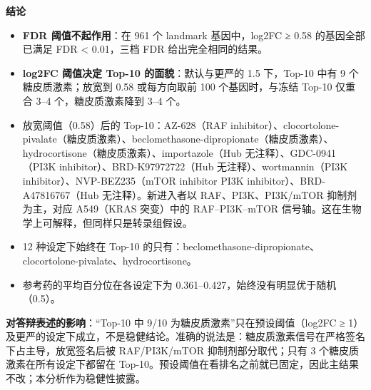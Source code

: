 \documentclass[
  10pt,
]{ctexart}
\providecommand{\tightlist}{%
  \setlength{\itemsep}{0pt}\setlength{\parskip}{0pt}}
\begin{document}
\textbf{结论}

\begin{itemize}
\tightlist
\item
  \textbf{FDR 阈值不起作用}：在 961 个 landmark
  基因中，\textbar log2FC\textbar{} ≥ 0.58 的基因全部已满足 FDR
  \textless{} 0.01，三档 FDR 给出完全相同的结果。
\item
  \textbf{\textbar log2FC\textbar{} 阈值决定 Top-10
  的面貌}：默认与更严的 1.5 下，Top-10 中有 9 个糖皮质激素；放宽到 0.58
  或每方向取前 100 个基因时，与冻结 Top-10 仅重合 3--4
  个，糖皮质激素降到 3--4 个。
\item
  放宽阈值（0.58）后的 Top-10：AZ-628（RAF
  inhibitor）、clocortolone-pivalate（糖皮质激素）、beclomethasone-dipropionate（糖皮质激素）、hydrocortisone（糖皮质激素）、importazole（Hub
  无注释）、GDC-0941（PI3K inhibitor）、BRD-K97972722（Hub
  无注释）、wortmannin（PI3K inhibitor）、NVP-BEZ235（mTOR inhibitor
  \textbar{} PI3K inhibitor）、BRD-A47816767（Hub 无注释）。新进入者以
  RAF、PI3K、PI3K/mTOR 抑制剂为主，对应 A549（KRAS 突变）中的
  RAF--PI3K--mTOR 信号轴。这在生物学上可解释，但同样只是转录组假设。
\item
  12 种设定下始终在 Top-10
  的只有：beclomethasone-dipropionate、clocortolone-pivalate、hydrocortisone。
\item
  参考药的平均百分位在各设定下为
  0.361--0.427，始终没有明显优于随机（0.5）。
\end{itemize}

\textbf{对答辩表述的影响}：``Top-10 中 9/10
为糖皮质激素''只在预设阈值（\textbar log2FC\textbar{} ≥
1）及更严的设定下成立，不是稳健结论。准确的说法是：糖皮质激素信号在严格签名下占主导，放宽签名后被
RAF/PI3K/mTOR 抑制剂部分取代；只有 3 个糖皮质激素在所有设定下都留在
Top-10。预设阈值在看排名之前就已固定，因此主结果不改；本分析作为稳健性披露。
\end{document}

